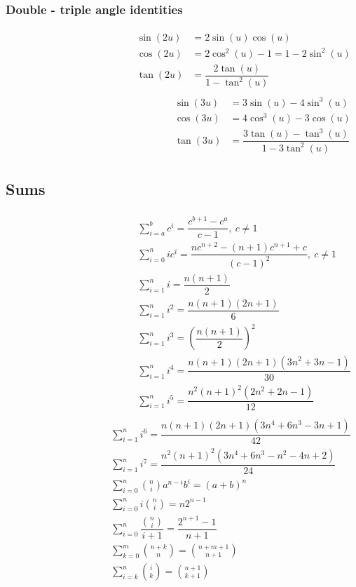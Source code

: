 \subsubsection{Double - triple angle identities}
\vspace{-0.6cm}
\begin{align*}
  \begin{split}
    \sin(2u) &= 2\sin(u)\cos(u) \\
    \cos(2u) &= 2\cos^2(u) - 1 = 1 - 2\sin^2(u) \\
    \tan(2u) &= \dfrac{2\tan(u)}{1-\tan^2(u)} \\
  \end{split}
  \begin{split}
    \sin(3u) &= 3\sin(u) - 4\sin^3(u) \\
    \cos(3u) &= 4\cos^3(u) - 3\cos(u) \\
    \tan(3u) &= \dfrac{3\tan(u) - \tan^3(u)}{1 - 3\tan^2(u)}
  \end{split}
\end{align*}

\subsection{Sums}
\vspace{-0.6cm}
\begin{align*}
  \begin{split}
    &\sum\limits_{i = a}^{b} c^i = \dfrac{c^{b + 1} - c^{a}}{c - 1},\ c \neq 1 \\
    &\sum\limits_{i = 0}^{n} i c^i = \dfrac{nc^{n + 2} - (n + 1)c^{n + 1} + c}{(c - 1)^2},\ c \neq 1 \\
    &\sum\limits_{i = 1}^{n} i = \dfrac{n(n + 1)}{2} \\
    &\sum\limits_{i = 1}^{n} i^2 = \dfrac{n(n + 1)(2n + 1)}{6} \\
    &\sum\limits_{i = 1}^{n} i^3 = \left(\dfrac{n(n + 1)}{2}\right)^2 \\
    &\sum\limits_{i = 1}^{n} i^4 = \dfrac{n(n + 1)(2n + 1)(3n^2 + 3n - 1)}{30} \\
    &\sum\limits_{i = 1}^{n} i^5 = \dfrac{n^2(n + 1)^2(2n^2 + 2n - 1)}{12} \\
  \end{split}
  \begin{split}
    &\sum\limits_{i = 1}^{n} i^6 = \dfrac{n(n + 1)(2n + 1)(3n^4 + 6n^3 - 3n + 1)}{42} \\
    &\sum\limits_{i = 1}^{n} i^7 = \dfrac{n^2(n + 1)^2(3n^4 + 6n^3 - n^2 - 4n + 2)}{24} \\
    &\sum\limits_{i = 0}^{n} {\binom{n}{i} a^{n - i} b^i} = (a + b)^n \\
    &\sum\limits_{i = 0}^{n} i \binom{n}{i} = n 2^{n - 1} \\
    &\sum\limits_{i = 0}^{n} \dfrac{\binom{n}{i}}{i + 1} = \dfrac{2^{n + 1} - 1}{n + 1} \\
    &\sum\limits_{k = 0}^{m} \binom{n + k}{n} = \binom{n + m + 1}{n + 1} \\
    &\sum\limits_{i = k}^{n} \binom{i}{k} = \binom{n + 1}{k + 1} \\
  \end{split}
\end{align*}

